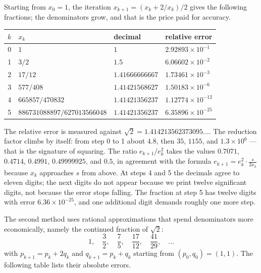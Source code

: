 Starting from $x_0=1$, the iteration $x_{k+1}=(x_k+2/x_k)/2$ gives the following
fractions; the denominators grow, and that is the price paid for accuracy.

\begin{center}\small
\begin{tabular}{rlll}
\hline
$k$ & $x_k$ & decimal & relative error \\
\hline
0 & $1$ & $1$ & $2.92893\times10^{-1}$ \\
1 & $3/2$ & $1.5$ & $6.06602\times10^{-2}$ \\
2 & $17/12$ & $1.41666666667$ & $1.73461\times10^{-3}$ \\
3 & $577/408$ & $1.41421568627$ & $1.50183\times10^{-6}$ \\
4 & $665857/470832$ & $1.41421356237$ & $1.12774\times10^{-12}$ \\
5 & $886731088897/627013566048$ & $1.41421356237$ & $6.35896\times10^{-25}$ \\
\hline
\end{tabular}
\end{center}

The relative error is measured against $\sqrt{2}=1.414213562373095\ldots$. The reduction
factor climbs by itself: from step 0 to 1 about $4.8$, then $35$, $1155$, and
$1.3\times10^{6}$ --- that is the signature of squaring. The ratio $e_{k+1}/e_k^2$ takes
the values $0.7071$, $0.4714$, $0.4991$, $0.49999925$, and $0.5$, in agreement with the
formula $e_{k+1}=e_k^2\cdot\frac{s}{2x_k}$ because $x_k$ approaches $s$ from above. At
steps 4 and 5 the decimals agree to eleven digits; the next digits do not appear because
we print twelve significant digits, not because the error stops falling. The fraction at
step 5 has twelve digits with error $6.36\times10^{-25}$, and one additional digit
demands roughly one more step.

The second method uses rational approximations that spend denominators more
economically, namely the continued fraction of $\sqrt2$:
\[
1,\quad \frac32,\quad \frac75,\quad \frac{17}{12},\quad \frac{41}{29},\quad \ldots
\]
with $p_{k+1}=p_k+2q_k$ and $q_{k+1}=p_k+q_k$ starting from $(p_0,q_0)=(1,1)$. The
following table lists their absolute errors.

